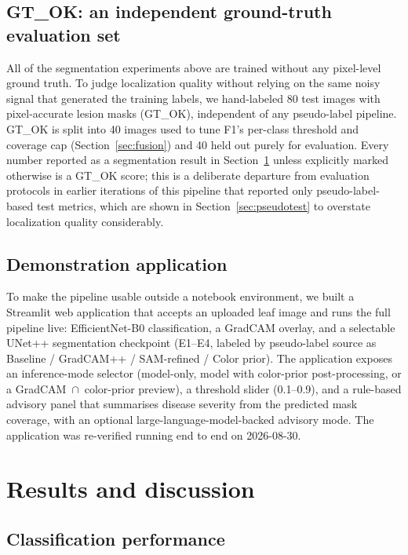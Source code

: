 \documentclass[final,5p,times,twocolumn,authoryear]{elsarticle}
\begin{document}
\subsection{GT\_OK: an independent ground-truth evaluation set}
\label{sec:gtok}

All of the segmentation experiments above are trained without any pixel-level ground truth. To judge localization quality without relying on the same noisy signal that generated the training labels, we hand-labeled 80 test images with pixel-accurate lesion masks (GT\_OK), independent of any pseudo-label pipeline. GT\_OK is split into 40 images used to tune F1's per-class threshold and coverage cap (Section~\ref{sec:fusion}) and 40 held out purely for evaluation. Every number reported as a segmentation result in Section~\ref{sec:results} unless explicitly marked otherwise is a GT\_OK score; this is a deliberate departure from evaluation protocols in earlier iterations of this pipeline that reported only pseudo-label-based test metrics, which are shown in Section~\ref{sec:pseudotest} to overstate localization quality considerably.

\subsection{Demonstration application}
\label{sec:demo}

To make the pipeline usable outside a notebook environment, we built a Streamlit web application that accepts an uploaded leaf image and runs the full pipeline live: EfficientNet-B0 classification, a GradCAM overlay, and a selectable UNet++ segmentation checkpoint (E1--E4, labeled by pseudo-label source as Baseline / GradCAM++ / SAM-refined / Color prior). The application exposes an inference-mode selector (model-only, model with color-prior post-processing, or a GradCAM~$\cap$~color-prior preview), a threshold slider (0.1--0.9), and a rule-based advisory panel that summarises disease severity from the predicted mask coverage, with an optional large-language-model-backed advisory mode. The application was re-verified running end to end on 2026-08-30.

\section{Results and discussion}
\label{sec:results}

\subsection{Classification performance}
\end{document}
